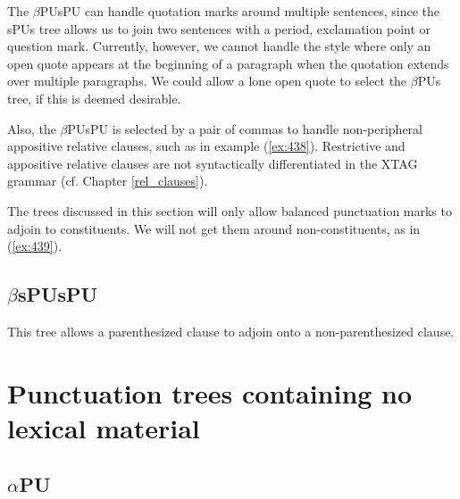 \beginsentences
{}\label{ex:437} 
\endsentences

 
The $\beta$PUsPU can handle quotation marks around multiple sentences, 
since the sPUs tree allows us to join two sentences with a period, 
exclamation point or question mark. Currently, however, we cannot 
handle the style where only an open quote appears at the beginning of 
a paragraph when the quotation extends over multiple 
paragraphs. We could allow a lone open quote to select the $\beta$PUs 
tree, if this is deemed desirable. 
 
Also, the $\beta$PUsPU is selected by a pair of commas to handle 
non-peripheral appositive relative clauses, such as in example 
(\ref{ex:438}). Restrictive and appositive relative clauses are not 
syntactically differentiated in the XTAG grammar 
(cf. Chapter \ref{rel_clauses}). 
 
\beginsentences
{}\label{ex:438} 
\endsentences

 
The trees discussed in this section will only allow balanced 
punctuation marks to adjoin to constituents. We will not get them 
around non-constituents, as in (\ref{ex:439}). 
 
\beginsentences
{}\label{ex:439} 
\endsentences

 
\subsection{$\beta$sPUsPU} 
 
This tree allows a parenthesized clause to adjoin onto a 
non-parenthesized clause. 
 
\beginsentences
{}\label{ex:440} 
\endsentences

 
\section{Punctuation trees containing no lexical material} 
 
\subsection{$\alpha$PU} 
 

